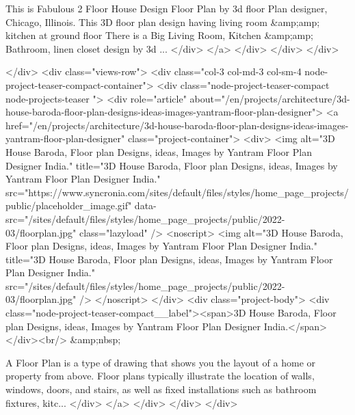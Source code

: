 This is Fabulous 2 Floor House Design Floor Plan by 3d floor Plan designer, Chicago, Illinois. This 3D floor plan design having living room &amp;amp; kitchen at ground floor There is a Big Living Room, Kitchen &amp;amp; Bathroom, linen closet design by 3d ...
				</div>
			</a>
		</div>
	</div>
</div>


  </div>
    <div class="views-row">
    <div class="col-3 col-md-3 col-sm-4 node-project-teaser-compact-container">
	<div class="node-project-teaser-compact node-projects-teaser ">
		<div  role="article" about="/en/projects/architecture/3d-house-baroda-floor-plan-designs-ideas-images-yantram-floor-plan-designer">
			<a href="/en/projects/architecture/3d-house-baroda-floor-plan-designs-ideas-images-yantram-floor-plan-designer" class="project-container">
				<div>
					<img alt="3D House Baroda, Floor plan Designs, ideas, Images by Yantram Floor Plan Designer India." title="3D House Baroda, Floor plan Designs, ideas, Images by Yantram Floor Plan Designer India." src="https://www.syncronia.com/sites/default/files/styles/home_page_projects/public/placeholder_image.gif" data-src="/sites/default/files/styles/home_page_projects/public/2022-03/floorplan.jpg" class="lazyload" />
					<noscript>
						<img alt="3D House Baroda, Floor plan Designs, ideas, Images by Yantram Floor Plan Designer India." title="3D House Baroda, Floor plan Designs, ideas, Images by Yantram Floor Plan Designer India." src="/sites/default/files/styles/home_page_projects/public/2022-03/floorplan.jpg" />
					</noscript>
				</div>
				<div class="project-body">
				<div class="node-project-teaser-compact__label"><span>3D House Baroda, Floor plan Designs, ideas, Images by Yantram Floor Plan Designer India.</span>
</div><br/>
				&amp;nbsp;

A Floor Plan is a type of drawing that shows you the layout of a home or property from above. Floor plans typically illustrate the location of walls, windows, doors, and stairs, as well as fixed installations such as bathroom fixtures, kitc...
				</div>
			</a>
		</div>
	</div>
</div>


